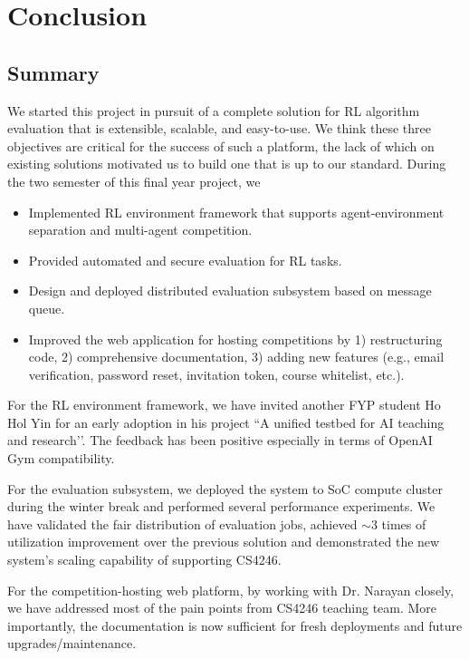 \chapter{Conclusion}
\label{ch:conclusion}

\section{Summary}
\label{s:conclusion-summary}
We started this project in pursuit of a complete solution for RL algorithm evaluation that is extensible, scalable, and easy-to-use. We think these three objectives are critical for the success of such a platform, the lack of which on existing solutions motivated us to build one that is up to our standard.
During the two semester of this final year project, we
\begin{itemize}
    \item Implemented RL environment framework that supports agent-environment separation and multi-agent competition.
    \item Provided automated and secure evaluation for RL tasks.
    \item Design and deployed distributed evaluation subsystem based on message queue.
    \item Improved the web application for hosting competitions by 1) restructuring code, 2) comprehensive documentation, 3) adding new features (e.g., email verification, password reset, invitation token, course whitelist, etc.).
\end{itemize}

For the RL environment framework, we have invited another FYP student Ho Hol Yin for an early adoption in his project ``A unified testbed for AI teaching and research’’. The feedback has been positive especially in terms of OpenAI Gym compatibility.

For the evaluation subsystem, we deployed the system to SoC compute cluster during the winter break and performed several performance experiments. We have validated the fair distribution of evaluation jobs, achieved $\sim$3 times of utilization improvement over the previous solution and demonstrated the new system’s scaling capability of supporting CS4246.

For the competition-hosting web platform, by working with Dr. Narayan closely, we have addressed most of the pain points from CS4246 teaching team. More importantly, the documentation is now sufficient for fresh deployments and future upgrades/maintenance.

